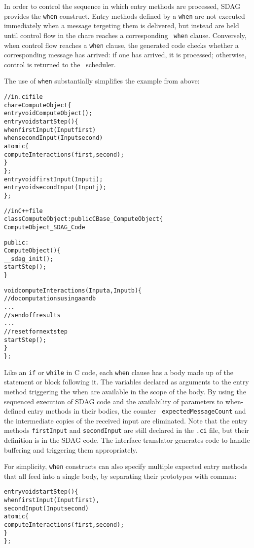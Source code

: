In order to control the sequence in which entry methods are processed, SDAG
provides the {\tt when} construct. Entry methods defined by a {\tt when} are
not executed immediately when a message tergeting them is delivered, but
instead are held until control flow in the chare reaches a corresponding {\tt
  when} clause. Conversely, when control flow reaches a {\tt when} clause, the
generated code checks whether a corresponding message has arrived: if one has
arrived, it is processed; otherwise, control is returned to the
\charmpp\ scheduler. 

The use of {\tt when} substantially simplifies the example from above:
\begin{center}
\begin{alltt}
// in .ci file
chare ComputeObject \{
  entry void ComputeObject();
  entry void startStep() \{
    when firstInput(Input first)
      when secondInput(Input second)
        atomic \{
          computeInteractions(first, second);
        \}
  \};
  entry void firstInput(Input i);
  entry void secondInput(Input j);
\};

// in C++ file
class ComputeObject : public CBase_ComputeObject \{
  ComputeObject_SDAG_Code

public:
  ComputeObject() \{
    __sdag_init();
    startStep();
  \}

  void computeInteractions(Input a, Input b) \{
    // do computations using a and b
    . . .
    // send off results
    . . .
    // reset for next step
    startStep();
  \}
\};
\end{alltt}
\end{center}
Like an {\tt if} or {\tt while} in C code, each {\tt when} clause has a body
made up of the statement or block following it. The variables declared as
arguments to the entry method triggering the when are available in the scope of
the body. By using the sequenced execution of SDAG code and the availability of
parameters to when-defined entry methods in their bodies, the counter {\tt
  expectedMessageCount} and the intermediate copies of the received input are
eliminated. Note that the entry methods {\tt firstInput} and {\tt secondInput}
are still declared in the {\tt .ci} file, but their definition is in the SDAG
code. The interface translator generates code to handle buffering and
triggering them appropriately.

For simplicity, {\tt when} constructs can also specify multiple expected entry
methods that all feed into a single body, by separating their prototypes with
commas:
\begin{center}
\begin{alltt}
entry void startStep() \{
  when firstInput(Input first),
       secondInput(Input second)
    atomic \{
      computeInteractions(first, second);
    \}
\};
\end{alltt}
\end{center}

